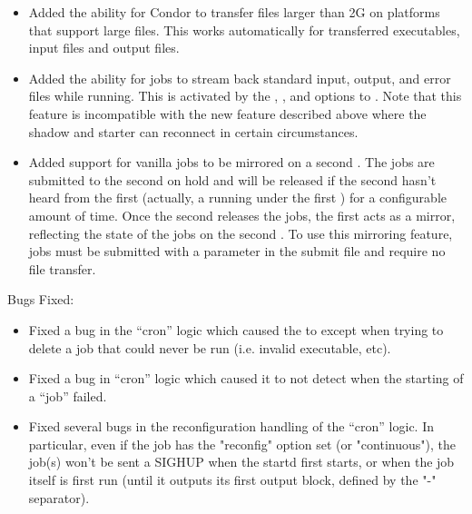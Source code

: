 \begin{itemize}
\item Added the ability for Condor to transfer files larger than 2G on
platforms that support large files.  This works automatically for
transferred executables, input files and output files.

\item Added the ability for jobs to stream back standard input, output, and
error files while running.  This is activated by the ,
, and  options to .
Note that this feature is incompatible with the new feature described
above where the shadow and starter can reconnect in certain
circumstances. 

\item Added support for vanilla jobs to be mirrored on a second
  . The jobs are submitted to the second 
  on hold and will be released if the second  hasn't
  heard from the first  (actually, a 
  running under the first ) for a configurable amount of
  time. Once the second  releases the jobs, the first
   acts as a mirror, reflecting the state of the jobs on
  the second .
  To use this mirroring feature, jobs must be submitted
  with a  parameter in the submit file and require
  no file transfer.

\end{itemize}


\noindent Bugs Fixed:

\begin{itemize}

\item Fixed a bug in the  ``cron'' logic which caused the
 to except when trying to delete a job that could never
be run (i.e. invalid executable, etc).

\item Fixed a bug in  ``cron'' logic which caused it to
not detect when the starting of a ``job'' failed.

\item Fixed several bugs in the reconfiguration handling of the
 ``cron'' logic.  In particular, even if the job has
the "reconfig" option set (or "continuous"), the job(s) won't be sent
a SIGHUP when the startd first starts, or when the job itself is first
run (until it outputs its first output block, defined by the "-"
separator).

\end{itemize}



